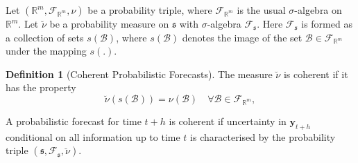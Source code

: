 \documentclass[a4paper, 11pt]{article}
\theoremstyle{definition}
\newtheorem{definition}{Definition}[section]
\begin{document}
Let $(\mathbb{R}^m, \mathscr{F}_{\mathbb{R}^m}, \nu)$ be a probability triple, where $\mathscr{F}_{\mathbb{R}^m}$ is the usual $\sigma$-algebra on $\mathbb{R}^m$. Let $\breve{\nu}$ be a probability measure on $\mathfrak{s}$ with $\sigma$-algebra $\mathscr{F}_{\mathfrak{s}}$. Here $\mathscr{F}_{\mathfrak{s}}$ is formed as a collection of sets $s(\mathcal{B})$, where $s(\mathcal{B})$ denotes the image of the set $\mathcal{B}\in \mathscr{F}_{\mathbb{R}^m}$ under the mapping $s(.)$.

\begin{definition}[Coherent Probabilistic Forecasts]\label{def:cohprob}
  The measure $\breve{\nu}$ is coherent if it has the property
  \[
    \breve{\nu}(s(\mathcal{B})) = \nu(\mathcal{B}) \quad \forall \mathcal{B} \in \mathscr{F}_{\mathbb{R}^m},
  \]
\end{definition}

A probabilistic forecast for time $t+h$ is coherent if uncertainty in $\bm{y}_{t+h}$ conditional on all information up to time $t$ is characterised by the probability triple $(\mathfrak{s},\mathscr{F}_{\mathfrak{s}},\breve{\nu})$.



\end{document}
